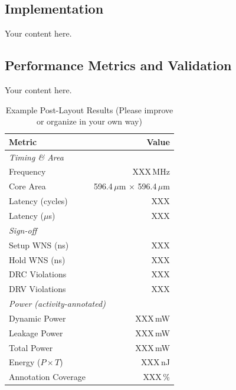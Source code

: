 \documentclass[conference]{IEEEtran}
\begin{document}
\subsection{Implementation}\label{sec:hp:impl}

{\color{hpcolor}Your content here.}

\subsection{Performance Metrics and Validation}\label{sec:hp:verif}

{\color{hpcolor}Your content here.}

\begin{table}[htbp]
\caption{Example Post-Layout Results (Please improve or organize in your own way)}
\label{tab:hp_postlayout}
\centering\footnotesize
\begin{tabular}{l r}
  \toprule
  \textbf{Metric} & \textbf{Value} \\
  \midrule
  \multicolumn{2}{l}{\textit{Timing \& Area}} \\
  Frequency               & {\color{hpcolor}XXX\,MHz} \\
  Core Area               & 596.4\,$\mu$m $\times$ 596.4\,$\mu$m \\
  Latency (cycles)        & {\color{hpcolor}XXX} \\
  Latency ($\mu$s)        & {\color{hpcolor}XXX} \\
  \midrule
  \multicolumn{2}{l}{\textit{Sign-off}} \\
  Setup WNS (ns)          & {\color{hpcolor}XXX} \\
  Hold WNS (ns)           & {\color{hpcolor}XXX} \\
  DRC Violations          & {\color{hpcolor}XXX} \\
  DRV Violations          & {\color{hpcolor}XXX} \\
  \midrule
  \multicolumn{2}{l}{\textit{Power (activity-annotated)}} \\
  Dynamic Power            & {\color{hpcolor}XXX\,mW} \\
  Leakage Power            & {\color{hpcolor}XXX\,mW} \\
  Total Power              & {\color{hpcolor}XXX\,mW} \\
  Energy ($P \times T$)    & {\color{hpcolor}XXX\,nJ} \\
  Annotation Coverage      & {\color{hpcolor}XXX\,\%} \\
  \bottomrule
\end{tabular}
\end{table}
\end{document}
